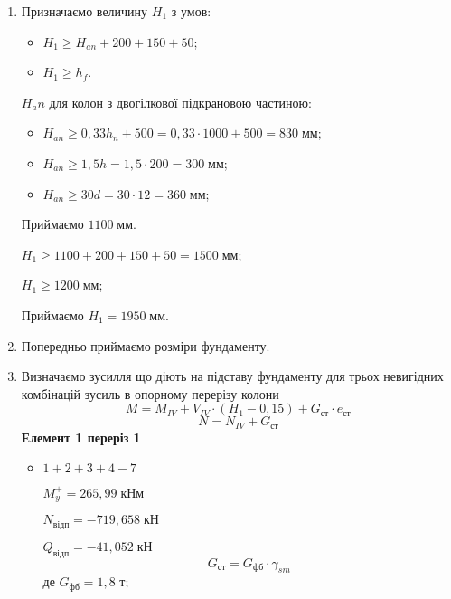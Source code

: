 \documentclass[a4paper,14pt]{article}
\begin{document}
\begin{enumerate}
    \item Призначаємо величину $H_1$ з умов: 
    \begin{itemize}
        \item $H_1 \geqslant H_{an} + 200 + 150 + 50$;
        \item $H_1 \geqslant h_f$.
    \end{itemize}
    $H_an$  для колон з двогілкової підкрановою частиною:
    \begin{itemize}
        \item $H_{an} \geqslant 0,33h_n + 500 = 0,33 \cdot 1000 + 500 = 830\;\textit{мм}$;
        \item $H_{an} \geqslant 1,5h = 1,5 \cdot 200 = 300\;\textit{мм}$;
        \item $H_{an} \geqslant 30d = 30 \cdot 12 = 360\;\textit{мм}$;
    \end{itemize}
    Приймаємо $1100\;\textit{мм}$.

     $H_1 \geqslant 1100 + 200 + 150 + 50 = 1500\;\textit{мм}$;

     $H_1 \geqslant 1200\;\textit{мм}$;

     Приймаємо $H_1 = 1950\;\text{мм}$.
    \item Попередньо приймаємо розміри фундаменту. %
    \item Визначаємо зусилля що діють на підставу фундаменту для трьох невигідних комбінацій зусиль в опорному перерізу колони
    \begin{equation}
        M = M_{IV} + V_{IV} \cdot (H_1 - 0,15) + G_{\textit{ст}} \cdot e_{\textit{ст}}
    \end{equation}
    \begin{equation}
        N = N_{IV} + G_{\textit{ст}}
    \end{equation}
    \textbf{Елемент 1 переріз 1}
    \begin{itemize}
        \item $1 + 2 + 3 + 4 - 7$
     
        $M_y^+ = 265,99\;\textit{кНм}$
        
        $N_{\textit{відп}} = - 719,658\;\textit{кН}$
   
        $Q_{\textit{відп}} = - 41,052\;\textit{кН}$
       \begin{equation}
           G_{\textit{ст}} = G_{\textit{фб}} \cdot \gamma_{sm}
       \end{equation}
       де $G_{\textit{фб}} = 1,8$ т;
   

\end{itemize}
\end{enumerate}
\end{document}

